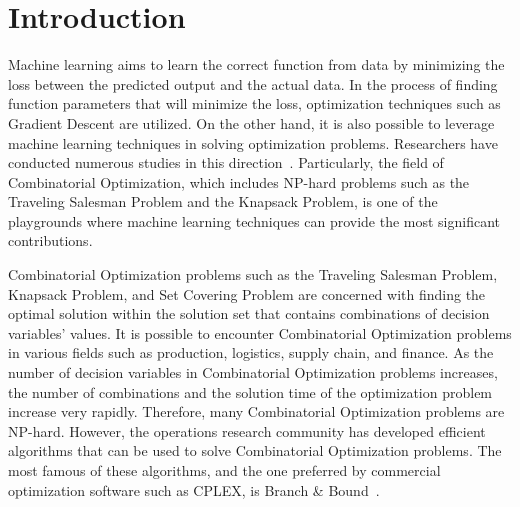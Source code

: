 \section{Introduction}\label{sec:introduction}

Machine learning aims to learn the correct function from data by minimizing the loss between the predicted output and the actual data.
In the process of finding function parameters that will minimize the loss, optimization techniques such as Gradient Descent are utilized.
On the other hand, it is also possible to leverage machine learning techniques in solving optimization problems.
Researchers have conducted numerous studies in this direction~\cite{bengio_machine_2020}.
Particularly, the field of Combinatorial Optimization, which includes NP-hard problems such as the Traveling Salesman Problem and the Knapsack Problem, is one of the playgrounds where machine learning techniques can provide the most significant contributions.

Combinatorial Optimization problems such as the Traveling Salesman Problem, Knapsack Problem, and Set Covering Problem are concerned with finding the optimal solution within the solution set that contains combinations of decision variables’ values.
It is possible to encounter Combinatorial Optimization problems in various fields such as production, logistics, supply chain, and finance.
As the number of decision variables in Combinatorial Optimization problems increases, the number of combinations and the solution time of the optimization problem increase very rapidly.
Therefore, many Combinatorial Optimization problems are NP-hard.
However, the operations research community has developed efficient algorithms that can be used to solve Combinatorial Optimization problems.
The most famous of these algorithms, and the one preferred by commercial optimization software such as CPLEX, is Branch \& Bound~\cite{wolsey_integer_1999}.

